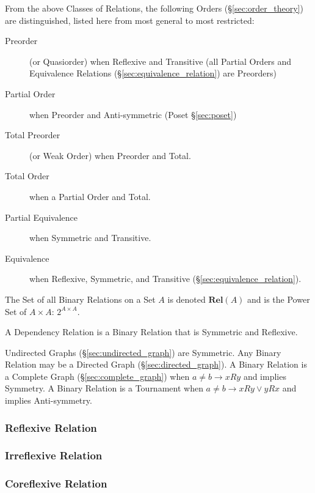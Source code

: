 From the above Classes of Relations, the following Orders
(\S\ref{sec:order_theory}) are distinguished, listed here from most
general to most restricted:
\begin{description}
\item[Preorder] (or Quasiorder) when Reflexive and Transitive (all
  Partial Orders and Equivalence Relations
  (\S\ref{sec:equivalence_relation}) are Preorders)
\item[Partial Order] when Preorder and Anti-symmetric (Poset
  \S\ref{sec:poset})
\item[Total Preorder] (or Weak Order) when Preorder and Total.
\item[Total Order] when a Partial Order and Total.
\item[Partial Equivalence] when Symmetric and Transitive.
\item[Equivalence] when Reflexive, Symmetric, and Transitive
  (\S\ref{sec:equivalence_relation}).
\end{description}

The Set of all Binary Relations on a Set $A$ is denoted
$\mathbf{Rel}(A)$ and is the Power Set of $A \times A$: $2^{A \times
  A}$.

A Dependency Relation is a Binary Relation that is Symmetric and
Reflexive.

Undirected Graphs (\S\ref{sec:undirected_graph}) are Symmetric. Any
Binary Relation may be a Directed Graph (\S\ref{sec:directed_graph}).
A Binary Relation is a Complete Graph (\S\ref{sec:complete_graph})
when $a \neq b \rightarrow xRy$ and implies Symmetry. A Binary
Relation is a Tournament when $a \neq b \rightarrow xRy \vee yRx$ and
implies Anti-symmetry.



\subsubsection{Reflexive Relation}\label{sec:reflexive_relation}

\subsubsection{Irreflexive Relation}\label{sec:irreflexive_relation}

\subsubsection{Coreflexive Relation}\label{sec:coreflexive_relation}


